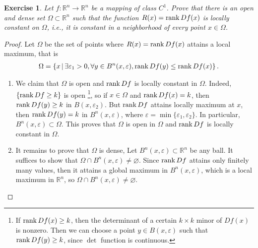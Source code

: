 \documentclass[11pt]{article}
\newtheorem{exercise}{Exercise}[section]
\theoremstyle{definition}
\numberwithin{equation}{subsection}
\begin{document}
\begin{exercise}{\rm *}
Let $f: \mathbb{R}^n \to \mathbb{R}^n$ be a mapping of class $C^1$. Prove that there is an open and dense set $\Omega \subset \mathbb{R}^n$ such that the function $R(x) = \rank Df(x)$ is locally constant on $\Omega$, i.e., it is constant in a neighborhood of every point $x \in \Omega$.
\end{exercise}
\begin{proof}
Let $\Omega$ be the set of points where $R(x) = \rank Df(x)$ attains a local maximum, that is
\begin{align*}
    \Omega = \left\{x \,|\, \exists \varepsilon_1 > 0, \forall y \in B^n(x, \varepsilon), \rank Df(y) \leq \rank Df(x) \right\}.
\end{align*}
\begin{enumerate}[label=(\alph*)]
    \item We claim that $\Omega$ is open and $\rank Df$ is locally constant in $\Omega$. Indeed, $\{\rank Df \geq k\}$ is open \footnote{If $\rank Df(x) \geq k$, then the determinant of a certain $k\times k$ minor of $Df(x)$ is nonzero. Then we can choose a point $y \in B(x, \varepsilon)$ such that $\rank Df(y) \geq k$, since $\det$ function is continuous.}, so if $x \in \Omega$ and $\rank Df(x) = k$, then $\rank Df(y) \geq k$ in $B(x, \varepsilon_2)$. But $\rank Df$ attains locally maximum at $x$, then $\rank Df(y) = k$ in $B^n(x, \varepsilon)$, where $\varepsilon = \min \{\varepsilon_1, \varepsilon_2\}$. In particular, $B^n(x, \varepsilon) \subset \Omega$. This proves that $\Omega$ is open in $\Omega$ and $\rank Df$ is locally constant in $\Omega$. 
    
    \item It remains to prove that $\Omega$ is dense, Let $B^n(x, \varepsilon) \subset \mathbb{R}^n$ be any ball. It suffices to show that $\Omega \cap B^n(x, \varepsilon) \neq \varnothing$. Since $\rank Df$ attains only finitely many values, then it attains a global maximum in $B^n(x, \varepsilon)$, which is a local maximum in $\mathbb{R}^n$, so $\Omega \cap B^n(x, \varepsilon) \neq \varnothing$.
\end{enumerate}
\end{proof}

\medskip
\end{document}
